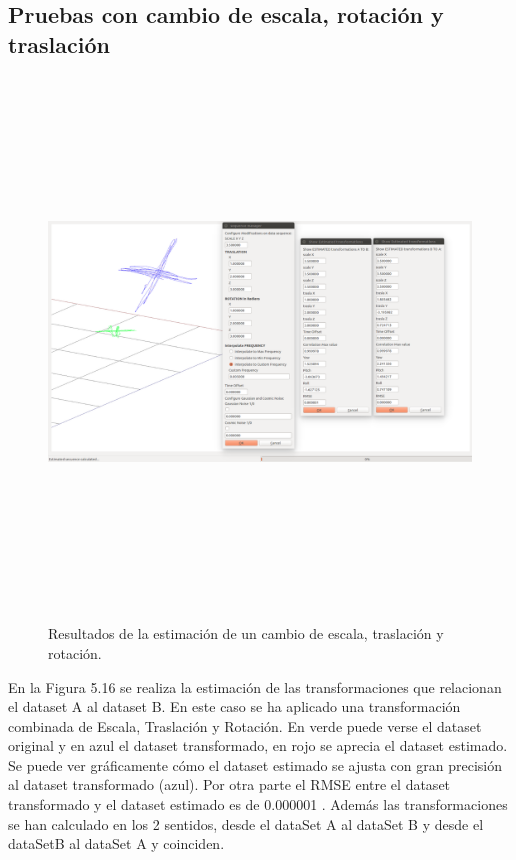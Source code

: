 \subsection{Pruebas con cambio de escala, rotación y traslación}
\begin{figure}[H]
\begin{center}
\label{fig:opciones de View}\includegraphics[height=14.0cm,width=18.0cm]{img/cap6/Escala_Trasla_Rota_abba.png}
\hspace{0.5cm}

\end{center}

\caption{Resultados de la estimación de un cambio de escala, traslación y rotación.}
\end{figure}

En la Figura 5.16 se realiza la estimación de las transformaciones que relacionan el dataset A al dataset B. En este caso se ha aplicado una transformación combinada de Escala, Traslación y Rotación. En verde puede verse el dataset original y en azul el dataset transformado, en rojo se aprecia el dataset estimado.
Se puede ver gráficamente cómo el dataset estimado se ajusta con gran precisión al dataset transformado (azul).
Por otra parte el RMSE entre el dataset transformado y el dataset estimado es de 0.000001
. Además las transformaciones se han calculado en los 2 sentidos, desde el dataSet A  al dataSet B y desde el dataSetB al dataSet A y coinciden.

